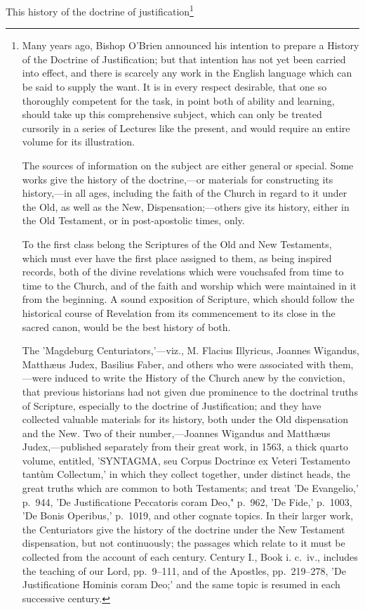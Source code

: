 \documentclass[
]{book}
\begin{document}
This history of the doctrine of justification\footnote{Many years ago, Bishop O'Brien announced his intention to prepare a History of the Doctrine of Justification; but that intention has not yet been carried into effect, and there is scarcely any work in the English language which can be said to supply the want. It is in every respect desirable, that one so thoroughly competent for the task, in point both of ability and learning, should take up this comprehensive subject, which can only be treated cursorily in a series of Lectures like the present, and would require an entire volume for its illustration.

  The sources of information on the subject are either general or special. Some works give the history of the doctrine,---or materials for constructing its history,---in all ages, including the faith of the Church in regard to it under the Old, as well as the New, Dispensation;---others give its history, either in the Old Testament, or in post-apostolic times, only.

  To the first class belong the Scriptures of the Old and New Testaments, which must ever have the first place assigned to them, as being inspired records, both of the divine revelations which were vouchsafed from time to time to the Church, and of the faith and worship which were maintained in it from the beginning. A sound exposition of Scripture, which should follow the historical course of Revelation from its commencement to its close in the sacred canon, would be the best history of both.

  The 'Magdeburg Centuriators,'---viz., M. Flacius Illyricus, Joannes Wigandus, Matthæus Judex, Basilius Faber, and others who were associated with them,---were induced to write the History of the Church anew by the conviction, that previous historians had not given due prominence to the doctrinal truths of Scripture, especially to the doctrine of Justification; and they have collected valuable materials for its history, both under the Old dispensation and the New. Two of their number,---Joannes Wigandus and Matthæus Judex,---published separately from their great work, in 1563, a thick quarto volume, entitled, 'SYNTAGMA, seu Corpus Doctrinœ ex Veteri Testamento tantùm Collectum,' in which they collect together, under distinct heads, the great truths which are common to both Testaments; and treat 'De Evangelio,' p.~944, 'De Justificatione Peccatoris coram Deo," p.~962, 'De Fide,' p.~1003, 'De Bonis Operibus,' p.~1019, and other cognate topics. In their larger work, the Centuriators give the history of the doctrine under the New Testament dispensation, but not continuously; the passages which relate to it must be collected from the account of each century. Century I., Book i. c.~iv., includes the teaching of our Lord, pp.~9--111, and of the Apostles, pp.~219--278, 'De Justificatione Hominis coram Deo;' and the same topic is resumed in each successive century.

}
\end{document}
